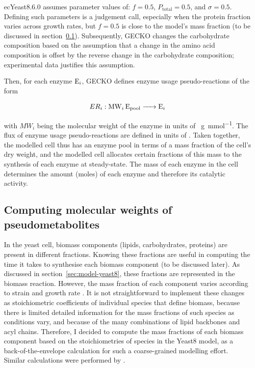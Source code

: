 ecYeast8.6.0 assumes parameter values of: $f = 0.5$, $P_{\mathrm{total}} = 0.5$, and $\sigma = 0.5$.
Defining such parameters is a judgement call, especially when the protein fraction varies across growth rates, but $f = 0.5$ is close to the model's mass fraction (to be discussed in section~\ref{subsec:model-yeast8-molweights}).
Subsequently, GECKO changes the carbohydrate composition based on the assumption that a change in the amino acid composition is offset by the reverse change in the carbohydrate composition;
experimental data justifies this assumption.

Then, for each enzyme $\ce{E_{i}}$, GECKO defines enzyme usage pseudo-reactions of the form

\begin{equation}
  ER_{i}: \ce{ MW_{i} E_{\mathrm{pool}} -> E_{i} }
  \label{eq:model-gecko-enzyme-usage}
\end{equation}

with $MW_{i}$ being the molecular weight of the enzyme in units of \SI{}{\gram~\milli\mole^{-1}}.
The flux of enzyme usage pseudo-reactions are defined in units of \SI{}{\mmolgdw}.
Taken together, the modelled cell thus has an enzyme pool in terms of a mass fraction of the cell's dry weight, and the modelled cell allocates certain fractions of this mass to the synthesis of each enzyme at steady-state.  The mass of each enzyme in the cell determines the amount (moles) of each enzyme and therefore its catalytic activity.

\subsection{Computing molecular weights of pseudometabolites}
\label{subsec:model-yeast8-molweights}

In the yeast cell, biomass components (lipids, carbohydrates, proteins) are present in different fractions.
Knowing these fractions are useful in computing the time it takes to synthesise each biomass component (to be discussed later).
As discussed in section~\ref{sec:model-yeast8}, these fractions are represented in the biomass reaction.
However, the mass fraction of each component varies according to strain and growth rate \parencite{nilssonMetabolicTradeoffsYeast2016, elsemmanWholecellModelingYeast2022}.
It is not straightforward to implement these changes as stoichiometric coefficients of individual species that define biomass, because there is limited detailed information for the mass fractions of such species as conditions vary, and because of the many combinations of lipid backbones and acyl chains.
Therefore, I decided to compute the mass fractions of each biomass component based on the stoichiometries of species in the Yeast8 model, as a back-of-the-envelope calculation for such a coarse-grained modelling effort.
Similar calculations were performed by \parencite{takhaveevTemporalSegregationBiosynthetic2023}.

